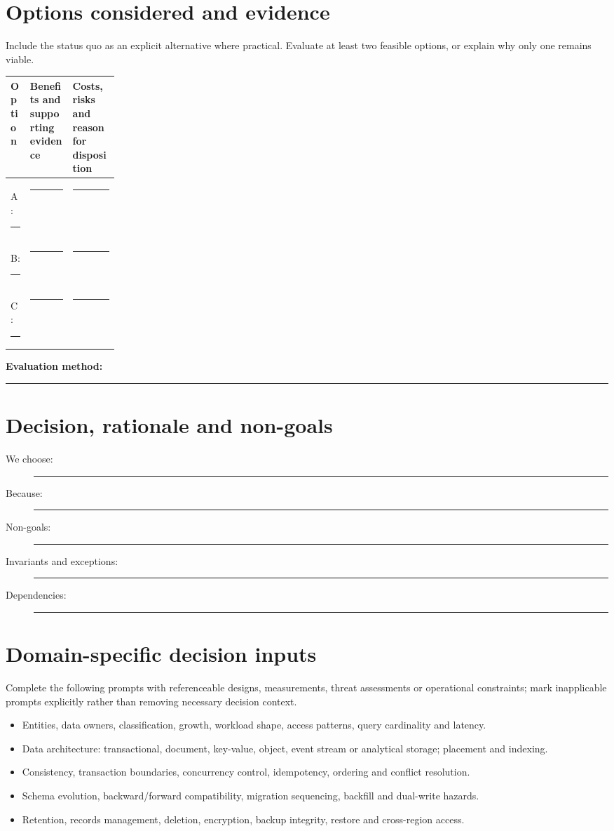 \documentclass[11pt,letterpaper]{article}
\newcommand{\BlankResponse}{\rule[-0.4em]{0pt}{2em}\rule{0.65\linewidth}{0.4pt}}
\begin{document}
\section{Options considered and evidence}
Include the status quo as an explicit alternative where practical. Evaluate
at least two feasible options, or explain why only one remains viable.
\par\noindent\begin{tabularx}{\linewidth}{@{}>{\raggedright\arraybackslash}p{0.18\linewidth}>{\raggedright\arraybackslash}X >{\raggedright\arraybackslash}X@{}}
\toprule
\textbf{Option} & \textbf{Benefits and supporting evidence} & \textbf{Costs, risks and reason for disposition}\\
\midrule
A: \BlankResponse & \BlankResponse & \BlankResponse\\
B: \BlankResponse & \BlankResponse & \BlankResponse\\
C: \BlankResponse & \BlankResponse & \BlankResponse\\
\bottomrule
\end{tabularx}\par

\noindent\textbf{Evaluation method:} \BlankResponse

\section{Decision, rationale and non-goals}
\begin{description}
\item[We choose:] \BlankResponse
\item[Because:] \BlankResponse
\item[Non-goals:] \BlankResponse
\item[Invariants and exceptions:] \BlankResponse
\item[Dependencies:] \BlankResponse
\end{description}

\section{Domain-specific decision inputs}
Complete the following prompts with referenceable designs, measurements,
threat assessments or operational constraints; mark inapplicable prompts
explicitly rather than removing necessary decision context.
\begin{itemize}
\item Entities, data owners, classification, growth, workload shape, access patterns, query cardinality and latency.
\item Data architecture: transactional, document, key-value, object, event stream or analytical storage; placement and indexing.
\item Consistency, transaction boundaries, concurrency control, idempotency, ordering and conflict resolution.
\item Schema evolution, backward/forward compatibility, migration sequencing, backfill and dual-write hazards.
\item Retention, records management, deletion, encryption, backup integrity, restore and cross-region access.
\end{itemize}
\end{document}

